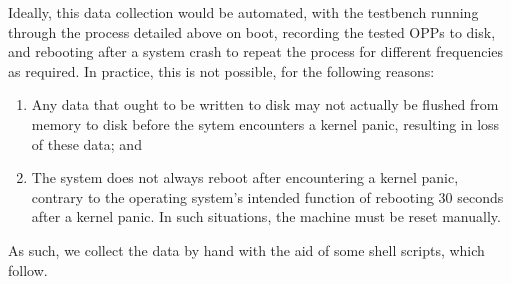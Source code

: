 Ideally, this data collection would be automated, with the testbench running
through the process detailed above on boot, recording the tested OPPs to disk,
and rebooting after a system crash to repeat the process for different
frequencies as required. In practice, this is not possible, for the following
reasons:
\begin{enumerate}
    \item Any data that ought to be written to disk may not actually be flushed
        from memory to disk before the sytem encounters a kernel panic, 
        resulting in loss of these data; and
    \item The system does not always reboot after encountering a kernel panic,
        contrary to the operating system's intended function of rebooting 30
        seconds after a kernel panic. In such situations, the machine must be
        reset manually.
\end{enumerate}

As such, we collect the data by hand with the aid of some shell scripts, which
follow.


